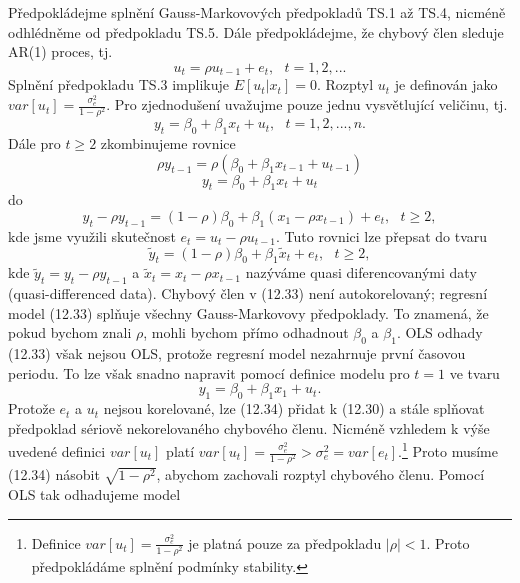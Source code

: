 Předpokládejme splnění Gauss-Markovových předpokladů TS.1 až TS.4, nicméně odhlédněme od předpokladu TS.5. Dále předpokládejme, že chybový člen sleduje AR(1) proces, tj.
\begin{equation}
u_t = \rho u_{t - 1} + e_t, ~~~ t = 1, 2, ...
\end{equation}
Splnění předpokladu TS.3 implikuje $E[u_t|x_t] = 0$. Rozptyl $u_t$ je definován jako $var[u_t] = \frac{\sigma^2_e}{1 - \rho^2}$. Pro zjednodušení uvažujme pouze jednu vysvětlující veličinu, tj.
\begin{equation}
y_t = \beta_0 + \beta_1 x_t + u_t, ~~~ t = 1, 2, ..., n.
\end{equation}
Dále pro $t \ge 2$ zkombinujeme rovnice
\begin{equation}
\rho y_{t - 1} = \rho (\beta_0 + \beta_1 x_{t - 1} + u_{t - 1})
\end{equation}
\begin{equation}
y_t = \beta_0 + \beta_1 x_t + u_t
\end{equation}
do
\begin{equation}
y_t - \rho y_{t - 1} = (1 - \rho)\beta_0 + \beta_1 (x_1 - \rho x_{t - 1}) + e_t, ~~~ t \ge 2,
\end{equation}
kde jsme využili skutečnost $e_t = u_t - \rho u_{t - 1}$. Tuto rovnici lze přepsat do tvaru
\begin{equation}
\tilde{y}_t = (1 - \rho) \beta_0 + \beta_1 \tilde{x}_t + e_t, ~~~ t \ge 2,
\end{equation}
kde $\tilde{y}_t = y_t - \rho y_{t - 1}$ a $\tilde{x}_t = x_t - \rho x_{t - 1}$ nazýváme quasi diferencovanými daty (quasi-differenced data). Chybový člen v (12.33) není autokorelovaný; regresní model (12.33) splňuje všechny Gauss-Markovovy předpoklady. To znamená, že pokud bychom znali $\rho$, mohli bychom přímo odhadnout $\beta_0$ a $\beta_1$. OLS odhady (12.33) však nejsou OLS, protože regresní model nezahrnuje první časovou periodu. To lze však snadno napravit pomocí definice modelu pro $t = 1$ ve tvaru
\begin{equation}
y_1 = \beta_0 + \beta_1 x_1 + u_t.
\end{equation}
Protože $e_t$ a $u_t$ nejsou korelované, lze (12.34) přidat k (12.30) a stále splňovat předpoklad sériově nekorelovaného chybového členu. Nicméně vzhledem k výše uvedené definici $var[u_t]$ platí $var[u_t] = \frac{\sigma^2_e}{1 - \rho^2} > \sigma^2_e = var[e_t]$.\footnote{Definice $var[u_t] = \frac{\sigma^2_e}{1 - \rho^2}$ je platná pouze za předpokladu $|\rho| < 1$. Proto předpokládáme splnění podmínky stability.} Proto musíme (12.34) násobit $\sqrt{1 - \rho^2}$, abychom zachovali rozptyl chybového členu. Pomocí OLS tak odhadujeme model
